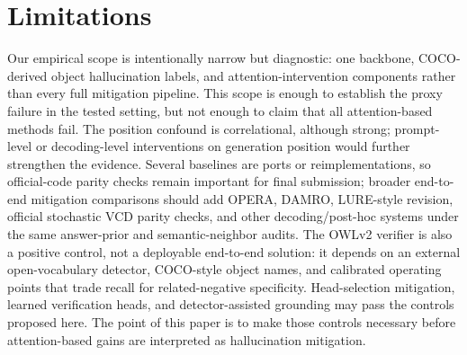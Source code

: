 \section*{Limitations}

Our empirical scope is intentionally narrow but diagnostic: one backbone, COCO-derived object hallucination labels, and attention-intervention components rather than every full mitigation pipeline. This scope is enough to establish the proxy failure in the tested setting, but not enough to claim that all attention-based methods fail. The position confound is correlational, although strong; prompt-level or decoding-level interventions on generation position would further strengthen the evidence. Several baselines are ports or reimplementations, so official-code parity checks remain important for final submission; broader end-to-end mitigation comparisons should add OPERA, DAMRO, LURE-style revision, official stochastic VCD parity checks, and other decoding/post-hoc systems under the same answer-prior and semantic-neighbor audits. The OWLv2 verifier is also a positive control, not a deployable end-to-end solution: it depends on an external open-vocabulary detector, COCO-style object names, and calibrated operating points that trade recall for related-negative specificity. Head-selection mitigation, learned verification heads, and detector-assisted grounding may pass the controls proposed here. The point of this paper is to make those controls necessary before attention-based gains are interpreted as hallucination mitigation.

